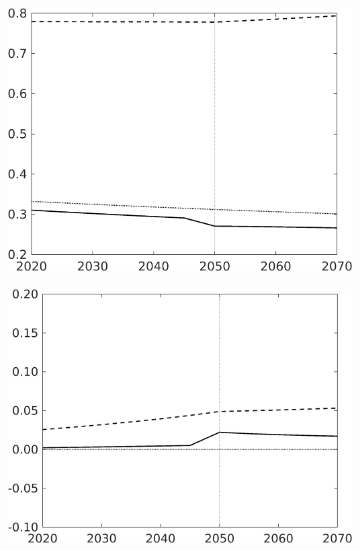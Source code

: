 \begin{figure}[h!!]
\begin{subfigure}[]{0.32\textwidth}
\end{subfigure}	
\begin{subfigure}[]{0.32\textwidth}
\includegraphics[width=1\textwidth]{../../codding_model/own_basedOnFried/optimalPol_010922_revision/figures/all_13Sept22_Tplus30/sn_CompEffOPT_T_NoTaus_regime4_opteff_knspil0_spillover0_noskill0_sep0_xgrowth0_countec0_PV1_etaa0.79_lgd0_lff1.png}
\end{subfigure}	
\begin{subfigure}[]{0.32\textwidth}
\includegraphics[width=1\textwidth]{../../codding_model/own_basedOnFried/optimalPol_010922_revision/figures/all_13Sept22_Tplus30/sg_CompEffOPT_T_NoTaus_regime4_opteff_knspil0_spillover0_noskill0_sep0_xgrowth0_countec0_PV1_etaa0.79_lgd0_lff1.png}
\end{subfigure}
\end{figure}

